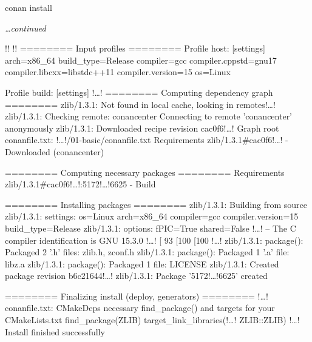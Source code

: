 \documentclass[compress, 8pt, aspectratio=169]{beamer}
\begin{document}
\begin{frame}[fragile]{conan install}

  \textit{\dots continued}\bigbreak

  {\small
  \begin{terminalwindow}[!!][minted options={escapeinside=!!, firstline=41}]
!!
!!
======== Input profiles ========
Profile host:
[settings]
arch=x86_64
build_type=Release
compiler=gcc
compiler.cppstd=gnu17
compiler.libcxx=libstdc++11
compiler.version=15
os=Linux

Profile build:
[settings]
!\dots!
======== Computing dependency graph ========
zlib/1.3.1: Not found in local cache, looking in remotes!\dots!
zlib/1.3.1: Checking remote: conancenter
Connecting to remote 'conancenter' anonymously
zlib/1.3.1: Downloaded recipe revision cac0f6!\dots!
Graph root
    conanfile.txt: !\dots!/01-basic/conanfile.txt
Requirements
    zlib/1.3.1#cac0f6!\dots! - Downloaded (conancenter)

======== Computing necessary packages ========
Requirements
    zlib/1.3.1#cac0f6!\dots!:5172!\dots!6625 - Build

======== Installing packages ========
zlib/1.3.1: Building from source
zlib/1.3.1: settings: os=Linux arch=x86_64 compiler=gcc compiler.version=15 build_type=Release
zlib/1.3.1: options: fPIC=True shared=False
!\dots!
-- The C compiler identification is GNU 15.3.0
!\dots!
[ 93%
[100%
[100%
!\dots!
zlib/1.3.1: package(): Packaged 2 '.h' files: zlib.h, zconf.h
zlib/1.3.1: package(): Packaged 1 '.a' file: libz.a
zlib/1.3.1: package(): Packaged 1 file: LICENSE
zlib/1.3.1: Created package revision b6c21644!\dots!
zlib/1.3.1: Package '5172!\dots!6625' created

======== Finalizing install (deploy, generators) ========
!\dots!
conanfile.txt: CMakeDeps necessary find_package() and targets for your CMakeLists.txt
    find_package(ZLIB)
    target_link_libraries(!\dots! ZLIB::ZLIB)
!\dots!
Install finished successfully
  \end{terminalwindow}
  }

\end{frame}
\end{document}
